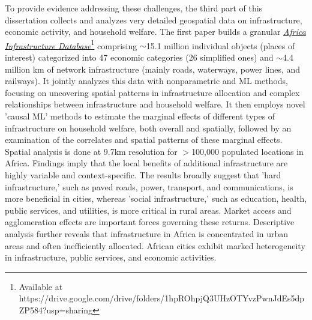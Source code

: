 \documentclass[a4paper]{article}
\begin{document}
To provide evidence addressing these challenges, the third part of this dissertation collects and analyzes very detailed geospatial data on infrastructure, economic activity, and household welfare. The first paper \citep{krantz2023mapping} builds a granular \href{https://drive.google.com/drive/folders/1hpROhpjQ3UHzOTYvzPwnJdEs5dpZP584?usp=sharing}{\emph{Africa Infrastructure Database}}\footnote{Available at https://drive.google.com/drive/folders/1hpROhpjQ3UHzOTYvzPwnJdEs5dpZP584?usp=sharing} comprising $\sim$15.1 million individual objects (places of interest) categorized into 47 economic categories (26 simplified ones) and $\sim$4.4 million km of network infrastructure (mainly roads, waterways, power lines, and railways). It jointly analyzes this data with nonparametric and ML methods, focusing on uncovering spatial patterns in infrastructure allocation and complex relationships between infrastructure and household welfare. It then employs novel 'causal ML' methods to estimate the marginal effects of different types of infrastructure on household welfare, both overall and spatially, followed by an examination of the correlates and spatial patterns of these marginal effects. Spatial analysis is done at 9.7km resolution for $>$100,000 populated locations in Africa. Findings imply that the local benefits of additional infrastructure are highly variable and context-specific. The results broadly suggest that 'hard infrastructure,' such as paved roads, power, transport, and communications, is more beneficial in cities, whereas 'social infrastructure,' such as education, health, public services, and utilities, is more critical in rural areas. Market access and agglomeration effects are important forces governing these returns. Descriptive analysis further reveals that infrastructure in Africa is concentrated in urban areas and often inefficiently allocated. African cities exhibit marked heterogeneity in infrastructure, public services, and economic activities. \newline 
\end{document}
